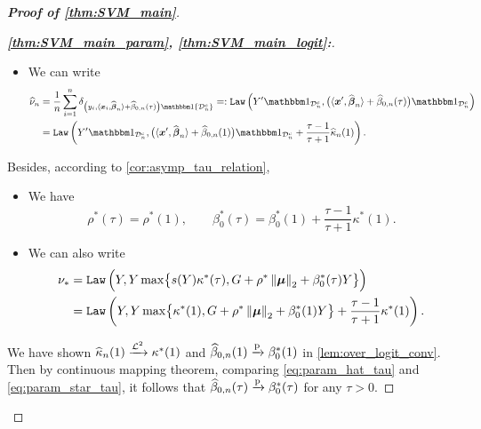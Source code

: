 \begin{proof}[\textbf{Proof of \cref{thm:SVM_main}}]
\begin{proof}[\textbf{\emph{\ref{thm:SVM_main_param}, \ref{thm:SVM_main_logit}:}}]
\begin{itemize}
    \item We can write
    \begin{equation}\label{eq:Ln_hat_tau}
        \begin{aligned}
            \hat \nu_{n} & = \frac1n \sum_{i=1}^n \delta_{ \left(y_i, \< \xx_i, \hat\vbeta_n \> + \hat\beta_{0,n}(\tau) \right)  \ind\{\cD_n^c\}  }
        =: \Law\left( Y' \ind_{\cD_n^c}, \bigl( \< \xx', \hat\vbeta_n \> + \hat\beta_{0,n}(\tau) \bigr) \ind_{\cD_n^c} \right) \\
        & = \Law \left( Y' \ind_{\cD_n^c},  \bigl( \< \xx', \hat\vbeta_n \> + \hat\beta_{0,n}(1) \bigr) \ind_{\cD_n^c}
        + \frac{\tau - 1}{\tau + 1} \hat\kappa_n(1)
        \right).
        \end{aligned}
    \end{equation}
\end{itemize}
Besides, according to \cref{cor:asymp_tau_relation},
\begin{itemize}
    \item We have
    \begin{equation}\label{eq:param_star_tau}
        \rho^*(\tau) = \rho^*(1),
        \qquad
        \beta_0^*(\tau) = \beta_0^*(1) + \frac{\tau - 1}{\tau + 1} \kappa^*(1).
    \end{equation}

    \item We can also write
    \begin{equation}\label{eq:Ln_star_tau}
    \begin{aligned}
        \nu_*
        & = \mathtt{Law} \, \Bigl( Y, Y \max \bigl\{ s(Y)\kappa^*(\tau) , G + \rho^*\left\|{{\boldsymbol{\mu}}}\right\|_2 + \beta_0^*(\tau) Y \bigr\} \Bigr) \\
        & = \mathtt{Law} \left( Y, Y \max \bigl\{ \kappa^*(1) , G + \rho^*\left\|{{\boldsymbol{\mu}}}\right\|_2 + \beta_0^*(1) Y \bigr\} 
        + \frac{\tau - 1}{\tau + 1} \kappa^*(1)
        \right).
    \end{aligned}
    \end{equation}
\end{itemize}
We have shown $\widehat\kappa_n(1) \xrightarrow{\mathcal{L}^{2}} \kappa^*(1)$ and $\widehat\beta_{0,n}(1) \xrightarrow{\mathrm{p}} \beta_0^*(1)$ in \cref{lem:over_logit_conv}. Then by continuous mapping theorem, comparing \cref{eq:param_hat_tau} and \eqref{eq:param_star_tau}, it follows that $\widehat\beta_{0, n}(\tau) \xrightarrow{\mathrm{p}} \beta_0^*(\tau)$ for any $\tau > 0$. 


\end{proof}
\end{proof}
